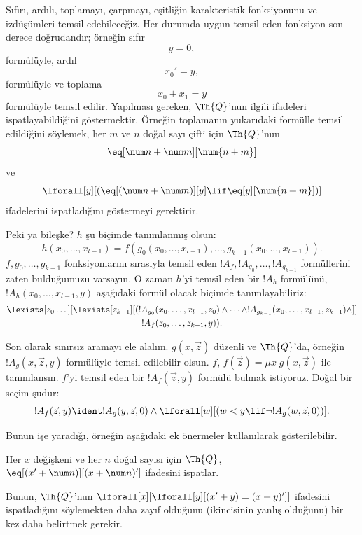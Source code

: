 Sıfırı, ardılı, toplamayı, çarpmayı, eşitliğin karakteristik fonksiyonunu ve
izdüşümleri temsil edebileceğiz. Her durumda uygun temsil eden fonksiyon
son derece doğrudandır; örneğin sıfır
\[
y = 0,
\]
formülüyle, ardıl
\[
x_0' = y,
\]
formülüyle ve toplama
\[
x_0 + x_1 = y
\]
formülüyle temsil edilir. Yapılması gereken, $\Th{Q}$'nun ilgili ifadeleri
ispatlayabildiğini göstermektir. Örneğin toplamanın yukarıdaki formülle temsil
edildiğini söylemek, her $m$ ve $n$ doğal sayı çifti için $\Th{Q}$'nun
\[
\eq[\num n + \num m][\num {n+m}]
\]
ve
\[
\lforall[y][(\eq[(\num n + \num m)][y] \lif \eq[y][\num {n+m}])]
\]
ifadelerini ispatladığını göstermeyi gerektirir.

Peki ya bileşke? $h$ şu biçimde tanımlanmış olsun:
\[
h(x_0,\dots,x_{l-1}) = f(g_0(x_0,\dots,x_{l-1}), \dots,
g_{k-1}(x_0,\dots,x_{l-1})).
\]
$f,g_0,\dots,g_{k-1}$ fonksiyonlarını sırasıyla temsil eden
$!A_f, !A_{g_0}, \dots, !A_{g_{k-1}}$ formüllerini zaten bulduğumuzu
varsayın. O zaman $h$'yi temsil eden bir $!A_h$ formülünü,
$!A_h(x_0,\dots,x_{l-1},y)$ aşağıdaki formül olacak biçimde tanımlayabiliriz:
\begin{multline*}
  \lexists[z_0\dots][\lexists[z_{k-1}][(!A_{g_0}(x_0,\dots,x_{l-1},z_0) \land
  \dots \land !A_{g_{k-1}}(x_0,\dots,x_{l-1},z_{k-1}) \land]]\\
  !A_f(z_0,\dots,z_{k-1},y)).
\end{multline*}

Son olarak sınırsız aramayı ele alalım. $g(x,\vec z)$ düzenli ve
$\Th{Q}$'da, örneğin $!A_g(x,\vec z,y)$ formülüyle temsil edilebilir olsun.
$f$, $f(\vec z) = \mu x \; g(x,\vec z)$ ile tanımlansın. $f$'yi temsil eden
bir $!A_f(\vec z,y)$ formülü bulmak istiyoruz. Doğal bir seçim şudur:
\[
!A_f(\vec z,y) \ident !A_g(y,\vec z,0) \land \lforall[w][(w < y
\lif \lnot !A_g(w,\vec z,0))].
\]

Bunun işe yaradığı, örneğin aşağıdaki ek önermeler kullanılarak gösterilebilir.

\begin{lem}
  Her $x$ değişkeni ve her $n$ doğal sayısı için $\Th{Q}$,
  $\eq[(x' + \num n)][(x + \num n)']$ ifadesini ispatlar.
\end{lem}

Bunun, $\Th{Q}$'nun
$\lforall[x][\lforall[y][(x' + y) = (x +y)']]$ ifadesini ispatladığını
söylemekten daha zayıf olduğunu (ikincisinin yanlış olduğunu) bir kez daha
belirtmek gerekir.

